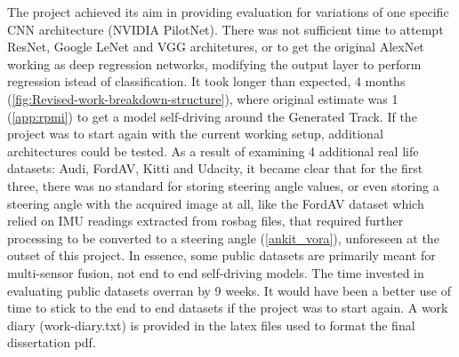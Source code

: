 The project achieved its aim in providing evaluation for variations of one specific CNN architecture (NVIDIA PilotNet). There was not sufficient time to attempt ResNet, Google LeNet and VGG architetures, or to get the original AlexNet working as deep regression networks, modifying the output layer to perform regression istead of classification. It took longer than expected, 4 months (\ref{fig:Revised-work-breakdown-structure}), where original estimate was 1 (\ref{app:rpmi}) to get a model self-driving around the Generated Track. If the project was to start again with the current working setup, additional architectures could be tested. As a result of examining 4 additional real life datasets: Audi, FordAV, Kitti and Udacity, it became clear that for the first three, there was no standard for storing steering angle values, or even storing a steering angle with the acquired image at all, like the FordAV dataset which relied on IMU readings extracted from rosbag files, that required further processing to be converted to a steering angle (\ref{ankit_vora}), unforeseen at the outset of this project. In essence, some public datasets are primarily meant for multi-sensor fusion, not end to end self-driving models. The time invested in evaluating public datasets overran by 9 weeks. It would have been a better use of time to stick to the end to end datasets if the project was to start again. A work diary (work-diary.txt) is provided in the latex files used to format the final dissertation pdf.

  


